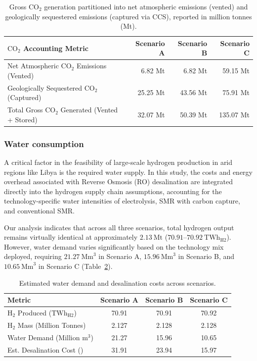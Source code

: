 \documentclass[preprint,12pt]{elsarticle}
\begin{document}
\begin{table}[htbp]
\centering
\caption{Gross $\text{CO}_2$ generation partitioned into net atmospheric emissions (vented) and geologically sequestered emissions (captured via CCS), reported in million tonnes (Mt).}
\label{tab:co2_mass_balance}
\begin{tabular}{lrrr}
\toprule
{$\text{CO}_2$ Accounting Metric} & {Scenario A} & {Scenario B} & {Scenario C} \\ \midrule
Net Atmospheric $\text{CO}_2$ Emissions (Vented) & 6.82 Mt & 6.82 Mt & 59.15 Mt \\
Geologically Sequestered $\text{CO}_2$ (Captured) & 25.25 Mt & 43.56 Mt & 75.91 Mt \\ \midrule
Total Gross $\text{CO}_2$ Generated (Vented + Stored) & 32.07 Mt & 50.39 Mt & 135.07 Mt \\ \bottomrule
\end{tabular}
\end{table}


\subsubsection{Water consumption}
\label{sec:desalination}
A critical factor in the feasibility of large-scale hydrogen production in arid regions like Libya is the required water supply. In this study, the costs and energy overhead associated with Reverse Osmosis (RO) desalination are integrated directly into the hydrogen supply chain assumptions, accounting for the technology-specific water intensities of electrolysis, SMR with carbon capture, and conventional SMR.

Our analysis indicates that across all three scenarios, total hydrogen output remains virtually identical at approximately $2.13~\text{Mt}$ ($70.91\text{--}70.92~\text{TWh}_{\text{H2}}$). However, water demand varies significantly based on the technology mix deployed, requiring $21.27~\text{Mm}^3$ in Scenario A, $15.96~\text{Mm}^3$ in Scenario B, and $10.65~\text{Mm}^3$ in Scenario C (Table~\ref{tab:water_demand}).

\begin{table}[htbp]
\centering
\caption{Estimated water demand and desalination costs across scenarios.}
\label{tab:water_demand}
\begin{tabular}{lccc}
\toprule
Metric & Scenario A & Scenario B & Scenario C \\
\midrule
$\text{H}_2$ Produced ($\text{TWh}_{\text{H2}}$) & 70.91 & 70.91 & 70.92 \\
$\text{H}_2$ Mass (Million Tonnes) & 2.127 & 2.128 & 2.128 \\
Water Demand (Million $\text{m}^3$) & 21.27 & 15.96 & 10.65 \\
Est. Desalination Cost (\text{M\texteuro/yr}) & 31.91 & 23.94 & 15.97 \\
\bottomrule
\end{tabular}
\end{table}
\end{document}
